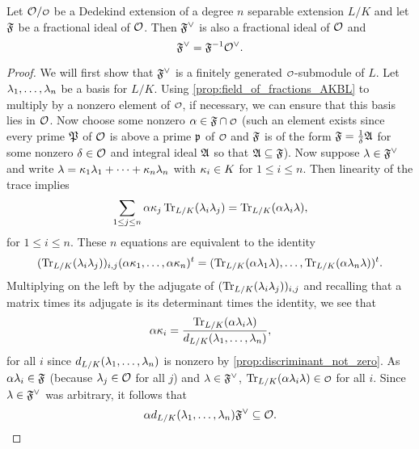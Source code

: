     \begin{proposition}\label{prop:dual_lattice_is_fractional}
      Let $\mc{O}/\smc{O}$ be a Dedekind extension of a degree $n$ separable extension $L/K$ and let $\mathfrak{F}$ be a fractional ideal of $\mathcal{O}$. Then $\mathfrak{F}^{\vee}$ is also a fractional ideal of $\mathcal{O}$ and
      \[
        \mathfrak{F}^{\vee} = \mathfrak{F}^{-1}\mathcal{O}^{\vee}.
      \]
    \end{proposition}
    \begin{proof}
      We will first show that $\mathfrak{F}^{\vee}$ is a finitely generated $\smc{O}$-submodule of $L$. Let $\lambda_{1},\ldots,\lambda_{n}$ be a basis for $L/K$. Using \cref{prop:field_of_fractions_AKBL} to multiply by a nonzero element of $\smc{O}$, if necessary, we can ensure that this basis lies in $\mathcal{O}$. Now choose some nonzero $\a \in \mf{F} \cap \smc{O}$ (such an element exists since every prime $\mathfrak{P}$ of $\mathcal{O}$ is above a prime $\mathfrak{p}$ of $\smc{O}$ and $\mathfrak{F}$ is of the form $\mathfrak{F} = \frac{1}{\delta}\mathfrak{A}$ for some nonzero $\delta \in \mathcal{O}$ and integral ideal $\mathfrak{A}$ so that $\mathfrak{A} \subseteq \mathfrak{F}$). Now suppose $\lambda \in \mathfrak{F}^{\vee}$ and write $\lambda = \kappa_{1}\lambda_{1}+\cdots+\kappa_{n}\lambda_{n}$ with $\kappa_{i} \in K$ for $1 \le i \le n$. Then linearity of the trace implies
      \[
        \sum_{1 \le j \le n}\alpha\kappa_{j}\operatorname{\mathrm{Tr}}_{L/K}(\lambda_{i}\lambda_{j}) = \operatorname{\mathrm{Tr}}_{L/K}(\alpha\lambda_{i}\lambda),
      \]
      for $1 \le i \le n$. These $n$ equations are equivalent to the identity
      \[
        (\operatorname{\mathrm{Tr}}_{L/K}(\lambda_{i}\lambda_{j}))_{i,j}(\alpha\kappa_{1},\ldots,\alpha\kappa_{n})^{t} = (\operatorname{\mathrm{Tr}}_{L/K}(\alpha\lambda_{1}\lambda),\ldots,\operatorname{\mathrm{Tr}}_{L/K}(\alpha\lambda_{n}\lambda))^{t}.
      \]
      Multiplying on the left by the adjugate of $(\operatorname{\mathrm{Tr}}_{L/K}(\lambda_{i}\lambda_{j}))_{i,j}$ and recalling that a matrix times its adjugate is its determinant times the identity, we see that
      \[
        \alpha\kappa_{i} = \frac{\operatorname{\mathrm{Tr}}_{L/K}(\alpha\lambda_{i}\lambda)}{d_{L/K}(\lambda_{1},\ldots,\lambda_{n})},
      \]
      for all $i$ since $d_{L/K}(\lambda_{1},\ldots,\lambda_{n})$ is nonzero by \cref{prop:discriminant_not_zero}. As $\alpha\lambda_{i} \in \mathfrak{F}$ (because $\lambda_{j} \in \mathcal{O}$ for all $j$) and $\lambda \in \mathfrak{F}^{\vee}$, $\Trace_{L/K}(\a\l_{i}\l) \in \smc{O}$ for all $i$. Since $\lambda \in \mathfrak{F}^{\vee}$ was arbitrary, it follows that
      \[
        \alpha d_{L/K}(\lambda_{1},\ldots,\lambda_{n})\mathfrak{F}^{\vee} \subseteq \mathcal{O}.
      \]

\end{proof}
